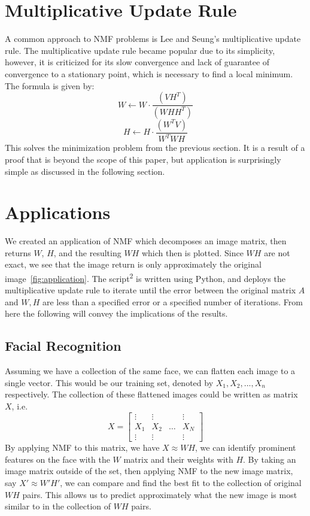 \documentclass[
10pt, %
a4paper, %
oneside, %
headinclude,footinclude, %
BCOR5mm, %
]{scrartcl}
\begin{document}
\section{Multiplicative Update Rule}
A common approach to NMF problems is Lee and Seung's multiplicative update rule. The multiplicative update rule became popular due to its simplicity, however, it is criticized for its slow convergence and lack of guarantee of convergence to a stationary point, which is necessary to find a local minimum.
The formula is given by\cite{algorithms}:
$$W\leftarrow W\cdot\frac{(VH^{T})}{(WHH^{T})}$$
$$H\leftarrow H\cdot\frac{(W^{T}V)}{W^{T}WH}$$
This solves the minimization problem from the previous section. It is a result of a proof that is beyond the scope of this paper, but application is surprisingly simple as discussed in the following section.

\section{Applications}
We created an application of NMF which decomposes an image matrix, then returns $W$, $H$, and the resulting $WH$ which then is plotted. Since $WH$ are not exact, we see that the image return is only approximately the original image~\vref{fig:application}. The script\textsuperscript{2} is written using Python, and deploys the multiplicative update rule to iterate until the error between the original matrix $A$ and $W,H$ are less than a specified error or a specified number of iterations. From here the following will convey the implications of the results.

\let\thefootnote\relax{}

\subsection{Facial Recognition}
Assuming we have a collection of the same face, we can flatten each image to a single vector. This would be our training set, denoted by $X_{1},X_{2},...,X_{n}$ respectively. The collection of these flattened images could be written as matrix $X$, i.e.
$$X=\begin{bmatrix}
        \vdots & \vdots &       & \vdots \\
        X_{1}  & X_{2}  & \dots & X_{N}  \\
        \vdots & \vdots &       & \vdots
    \end{bmatrix}$$
By applying NMF to this matrix, we have $X\approx WH$, we can identify prominent features on the face with the $W$ matrix and their weights with $H$. By taking an image matrix outside of the set, then applying NMF to the new image matrix, say $X'\approx W'H'$, we can compare and find the best fit to the collection of original $WH$ pairs. This allows us to predict approximately what the new image is most similar to in the collection of $WH$ pairs.
\end{document}
